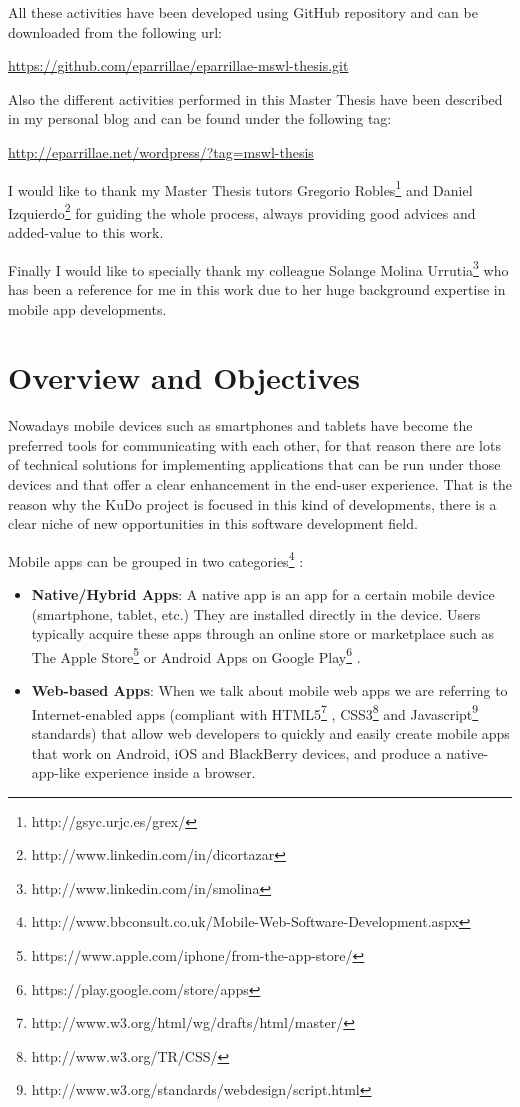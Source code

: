 \documentclass[a4paper,12pt]{book}
\begin{document}
All these activities have been developed using GitHub repository and can be downloaded from the following url:

\url{
https://github.com/eparrillae/eparrillae-mswl-thesis.git}

Also the different activities performed in this Master Thesis have been described in my personal blog and can be found under the following tag:

\url{
http://eparrillae.net/wordpress/?tag=mswl-thesis}

I would like to thank my Master Thesis tutors Gregorio Robles\footnote{http://gsyc.urjc.es/grex/} and Daniel Izquierdo\footnote{http://www.linkedin.com/in/dicortazar} for guiding the whole process, always providing good advices and added-value to this work.

Finally I would like to specially thank my colleague Solange Molina Urrutia\footnote{http://www.linkedin.com/in/smolina} who has been a reference for me in this work due to her huge background expertise in mobile app developments.  


\chapter{Overview and Objectives}
\label{chap:overview}

Nowadays mobile devices such as smartphones and tablets have become the preferred tools for communicating with each other, for that reason there are lots of technical solutions for implementing applications that can be run under those devices and that offer a clear enhancement in the end-user experience. That is the reason why the KuDo project is focused in this kind of developments, there is a clear niche of new opportunities in this software development field.

Mobile apps can be grouped in two categories\footnote{http://www.bbconsult.co.uk/Mobile-Web-Software-Development.aspx} :

\begin{itemize}
 \item \textbf{Native/Hybrid Apps}: A native app is an app for a certain mobile device (smartphone, tablet, etc.) They are installed directly in the device. Users typically acquire these apps through an online store or marketplace such as The Apple Store\footnote{https://www.apple.com/iphone/from-the-app-store/} or Android Apps on Google Play\footnote{https://play.google.com/store/apps} .
 \item \textbf{Web-based Apps}: When we talk about mobile web apps we are referring to Internet-enabled apps (compliant with HTML5\footnote{http://www.w3.org/html/wg/drafts/html/master/} , CSS3\footnote{http://www.w3.org/TR/CSS/} and Javascript\footnote{http://www.w3.org/standards/webdesign/script.html}  standards) that allow web developers to quickly and easily create mobile apps that work on Android, iOS and BlackBerry devices, and produce a native-app-like experience inside a browser. 
\end{itemize}
\end{document}
